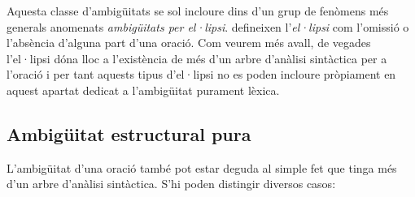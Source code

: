\begin{enumerate}
  Aquesta classe d'ambigüitats se sol incloure dins d'un grup de
  fenòmens més generals anomenats \emph{ambigüitats per el·lipsi}.
  \citet{alcaraz97b} defineixen l'\emph{el·lipsi}\label{pg:ellipsi}
  com l'omissió o l'absència d'alguna part d'una oració. Com veurem
  més avall, de vegades l'el·lipsi dóna lloc a l'existència de més
  d'un arbre d'anàlisi sintàctica per a l'oració i per tant aquests
  tipus d'el·lipsi no es poden incloure pròpiament en aquest apartat
  dedicat a l'ambigüitat purament lèxica.

\end{enumerate} 

\subsection{Ambigüitat estructural pura}
\label{ss:ambest}
L'ambigüitat d'una oració també pot estar deguda al simple fet que
tinga més d'un arbre d'anàlisi sintàctica. S'hi poden distingir diversos
casos:
